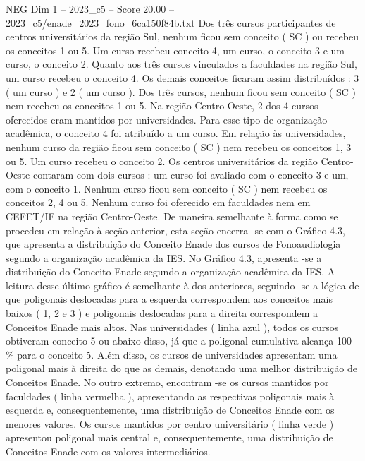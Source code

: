 \begin{textsample}{NEG Dim 1 – 2023\_c5 – Score 20.00 – 2023\_c5/enade\_2023\_fono\_6ca150f84b.txt}
Dos três cursos participantes de centros universitários da região Sul, nenhum ficou sem conceito ( SC ) ou recebeu os conceitos 1 ou 5.
Um curso recebeu conceito 4, um curso, o conceito 3 e um curso, o conceito 2.
Quanto aos três cursos vinculados a faculdades na região Sul, um curso recebeu o conceito 4.
Os demais conceitos ficaram assim distribuídos : 3 ( um curso ) e 2 ( um curso ).
Dos três cursos, nenhum ficou sem conceito ( SC ) nem recebeu os conceitos 1 ou 5.
Na região Centro-Oeste, 2 dos 4 cursos oferecidos eram mantidos por universidades.
Para esse tipo de organização acadêmica, o conceito 4 foi atribuído a um curso.
Em relação às universidades, nenhum curso da região ficou sem conceito ( SC ) nem recebeu os conceitos 1, 3 ou 5.
Um curso recebeu o conceito 2.
Os centros universitários da região Centro-Oeste contaram com dois cursos : um curso foi avaliado com o conceito 3 e um, com o conceito 1.
Nenhum curso ficou sem conceito ( SC ) nem recebeu os conceitos 2, 4 ou 5.
Nenhum curso foi oferecido em faculdades nem em CEFET/IF na região Centro-Oeste.
De maneira semelhante à forma como se procedeu em relação à seção anterior, esta seção encerra -se com o Gráfico 4.3, que apresenta a distribuição do Conceito Enade dos cursos de Fonoaudiologia segundo a organização acadêmica da IES.
No Gráfico 4.3, apresenta -se a distribuição do Conceito Enade segundo a organização acadêmica da IES.
A leitura desse último gráfico é semelhante à dos anteriores, seguindo -se a lógica de que poligonais deslocadas para a esquerda correspondem aos conceitos mais baixos ( 1, 2 e 3 ) e poligonais deslocadas para a direita correspondem a Conceitos Enade mais altos.
Nas universidades ( linha azul ), todos os cursos obtiveram conceito 5 ou abaixo disso, já que a poligonal cumulativa alcança 100 \% para o conceito 5.
Além disso, os cursos de universidades apresentam uma poligonal mais à direita do que as demais, denotando uma melhor distribuição de Conceitos Enade.
No outro extremo, encontram -se os cursos mantidos por faculdades ( linha vermelha ), apresentando as respectivas poligonais mais à esquerda e, consequentemente, uma distribuição de Conceitos Enade com os menores valores.
Os cursos mantidos por centro universitário ( linha verde ) apresentou poligonal mais central e, consequentemente, uma distribuição de Conceitos Enade com os valores intermediários.

\end{textsample}
